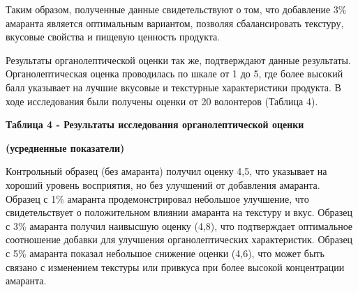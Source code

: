 {Таким образом, полученные данные свидетельствуют о том, что добавление
3\% амаранта является оптимальным вариантом, позволяя сбалансировать
текстуру, вкусовые свойства и пищевую ценность продукта.

Результаты органолептической оценки так же, подтверждают данные
результаты. Органолептическая оценка проводилась по шкале от 1 до 5, где
более высокий балл указывает на лучшие вкусовые и текстурные
характеристики продукта. В ходе исследования были получены оценки от 20
волонтеров (Таблица 4).

{\bfseries Таблица 4 - Результаты исследования органолептической оценки}

{\bfseries (усредненные показатели)}


Контрольный образец (без амаранта) получил оценку 4,5, что указывает на
хороший уровень восприятия, но без улучшений от добавления амаранта.
Образец с 1\% амаранта продемонстрировал небольшое улучшение, что
свидетельствует о положительном влиянии амаранта на текстуру и вкус.
Образец с 3\% амаранта получил наивысшую оценку (4,8), что подтверждает
оптимальное соотношение добавки для улучшения органолептических
характеристик. Образец с 5\% амаранта показал небольшое снижение оценки
(4,6), что может быть связано с изменением текстуры или привкуса при
более высокой концентрации амаранта.

}
